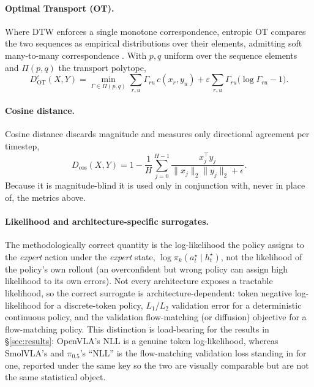 \documentclass[11pt]{article}
\numberwithin{equation}{section}
\numberwithin{table}{section}
\numberwithin{figure}{section}
\begin{document}
\paragraph{Optimal Transport (OT).} Where DTW enforces a single monotone correspondence, entropic OT
compares the two sequences as empirical distributions over their elements, admitting soft many-to-many
correspondence \cite{cuturi2013sinkhorn}. With $p,q$ uniform over the sequence elements and $\Pi(p,q)$
the transport polytope,
\begin{equation}
  D^{\varepsilon}_{\mathrm{OT}}(X,Y) = \min_{\Gamma\in\Pi(p,q)} \sum_{r,u}\Gamma_{ru}\,c(x_r,y_u)
    + \varepsilon\sum_{r,u}\Gamma_{ru}\big(\log\Gamma_{ru}-1\big).
  \label{eq:ot}
\end{equation}

\paragraph{Cosine distance.} Cosine distance discards magnitude and measures only directional
agreement per timestep,
\begin{equation}
  D_{\cos}(X,Y) = 1-\frac{1}{H}\sum_{j=0}^{H-1}\frac{x_j^\top y_j}{\lVert x_j\rVert_2\lVert y_j\rVert_2+\epsilon}.
  \label{eq:cos}
\end{equation}
Because it is magnitude-blind it is used only in conjunction with, never in place of, the metrics above.

\paragraph{Likelihood and architecture-specific surrogates.} The methodologically correct quantity is
the log-likelihood the policy assigns to the \emph{expert} action under the \emph{expert} state,
$\log\pi_k(a^\star_t\mid h^\star_t)$, not the likelihood of the policy's own rollout (an overconfident
but wrong policy can assign high likelihood to its own errors). Not every architecture exposes a
tractable likelihood, so the correct surrogate is architecture-dependent: token negative log-likelihood
for a discrete-token policy, $L_1$/$L_2$ validation error for a deterministic continuous policy, and the
validation flow-matching (or diffusion) objective for a flow-matching policy. This distinction is
load-bearing for the results in \S\ref{sec:results}: OpenVLA's NLL is a genuine token log-likelihood,
whereas SmolVLA's and $\pi_{0.5}$'s ``NLL'' is the flow-matching validation loss standing in for one,
reported under the same key so the two are visually comparable but are not the same statistical object.
\end{document}
